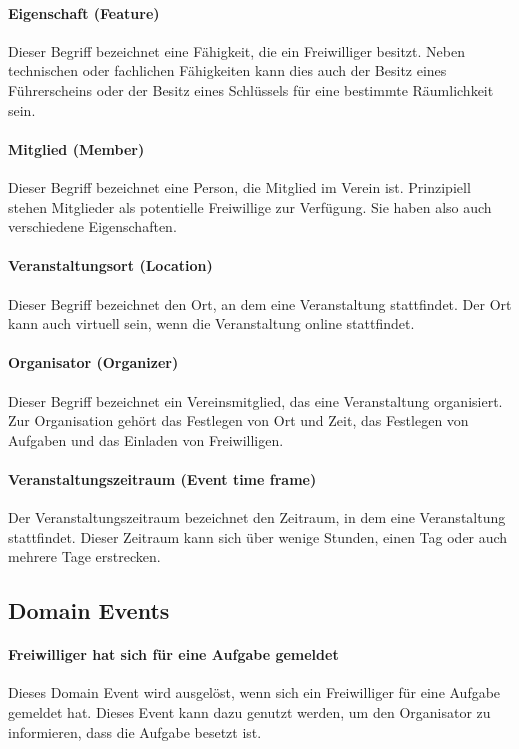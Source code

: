 \paragraph{\glqq Eigenschaft\grqq{} (Feature)}
Dieser Begriff bezeichnet eine Fähigkeit, die ein Freiwilliger besitzt. Neben technischen oder fachlichen Fähigkeiten kann dies auch der Besitz eines Führerscheins oder der Besitz eines Schlüssels für eine bestimmte Räumlichkeit sein.

\paragraph{\glqq Mitglied\grqq{} (Member)}
Dieser Begriff bezeichnet eine Person, die Mitglied im Verein ist. Prinzipiell stehen Mitglieder als potentielle Freiwillige zur Verfügung. Sie haben also auch verschiedene Eigenschaften.

\paragraph{\glqq Veranstaltungsort\grqq{} (Location)}
Dieser Begriff bezeichnet den Ort, an dem eine Veranstaltung stattfindet. Der Ort kann auch \glqq virtuell\grqq{} sein, wenn die Veranstaltung online stattfindet.

\paragraph{\glqq Organisator\grqq{} (Organizer)}
Dieser Begriff bezeichnet ein Vereinsmitglied, das eine Veranstaltung organisiert. Zur Organisation gehört das Festlegen von Ort und Zeit, das Festlegen von Aufgaben und das Einladen von Freiwilligen.

\paragraph{\glqq Veranstaltungszeitraum\grqq{} (Event time frame)}
Der Veranstaltungszeitraum bezeichnet den Zeitraum, in dem eine Veranstaltung stattfindet.
Dieser Zeitraum kann sich über wenige Stunden, einen Tag oder auch mehrere Tage erstrecken.

\subsection{Domain Events}

\paragraph{\glqq Freiwilliger hat sich für eine Aufgabe gemeldet\grqq}
Dieses Domain Event wird ausgelöst, wenn sich ein Freiwilliger für eine Aufgabe gemeldet hat. Dieses Event kann dazu genutzt werden, um den Organisator zu informieren, dass die Aufgabe besetzt ist.

